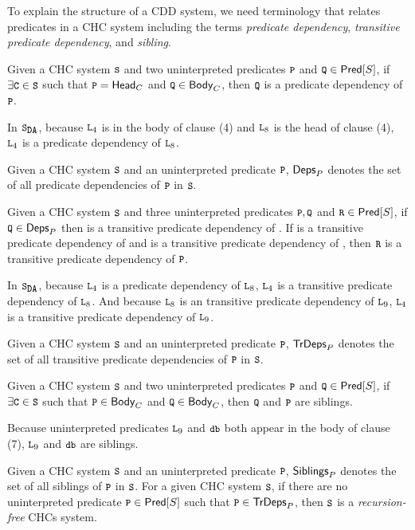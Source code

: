 To explain the structure of a CDD system, we need terminology that relates
predicates in a CHC system including the terms \emph{predicate dependency},
\emph{transitive predicate dependency}, and \emph{sibling}.
\begin{defn}
  Given a CHC system $\cc{S}$ and two uninterpreted predicates
  $\cc{P}$ and $\cc{Q} \in \predof{S}$, if $\exists \cc{C} \in \cc{S}$
  such that $\cc{P} = \headof{C}$ and $\cc{Q} \in \bodyof{C}$, then
  $\cc{Q}$ is a predicate dependency of $\cc{P}$.
\end{defn}
%
\begin{ex}
  In $\mcchc$, because $\cc{L}_4$ is in the body of clause (4) and
  $\cc{L}_8$ is the head of clause (4), $\cc{L}_4$ is a predicate
  dependency of $\cc{L}_8$.
\end{ex}
%
Given a CHC system $\cc{S}$ and an uninterpreted predicate $\cc{P}$,
$\mathsf{Deps}_{P}$ denotes the set of all predicate dependencies of $\cc{P}$
in $\cc{S}$.
%
\begin{defn}
  Given a CHC system $\cc{S}$ and three uninterpreted predicates
  $\cc{P}, \cc{Q}$ and $\cc{R} \in \predof{S}$, if $\cc{Q} \in
  \depsof{P}$ then  is a transitive predicate dependency of
  .
  If  is a transitive predicate dependency of  and 
  is a transitive predicate dependency of , then $\cc{R}$ is a
  transitive predicate dependency of $\cc{P}$.
\end{defn}
%
\begin{ex}
  In $\mcchc$, because $\cc{L}_4$ is a predicate dependency of
  $\cc{L}_8$, $\cc{L}_4$ is a transitive predicate dependency of
  $\cc{L}_8$.
  And because $\cc{L}_8$ is an transitive predicate dependency of
  $\cc{L}_9$, $\cc{L}_4$ is a transitive predicate dependency of
  $\cc{L}_9$.
\end{ex}
%
Given a CHC system $\cc{S}$ and an uninterpreted predicate $\cc{P}$,
$\mathsf{TrDeps}_{P}$ denotes the set of all transitive predicate dependencies
of $\cc{P}$ in $\cc{S}$.
%
\begin{defn}
  Given a CHC system $\cc{S}$ and two uninterpreted predicates
  $\cc{P}$ and $\cc{Q} \in \predof{S}$, if $\exists \cc{C} \in \cc{S}$
  such that $\cc{P} \in \bodyof{C}$ and $\cc{Q} \in \bodyof{C}$, then
  $\cc{Q}$ and $\cc{P}$ are siblings.
\end{defn}
%
\begin{ex}
  Because uninterpreted predicates $\cc{L}_9$ and $\cc{db}$ both
  appear in the body of clause (7), $\cc{L}_9$ and $\cc{db}$ are
  siblings.
\end{ex}
%
Given a CHC system $\cc{S}$ and an uninterpreted predicate $\cc{P}$,
$\mathsf{Siblings}_{P}$ denotes the set of all siblings of $\cc{P}$
in $\cc{S}$.
%
For a given CHC system $\cc{S}$, if there are no uninterpreted
predicate $\cc{P} \in \predof{S}$ such that $\cc{P} \in \tdepsof{P}$,
then $\cc{S}$ is a \emph{recursion-free} CHCs system.
%


